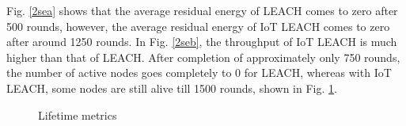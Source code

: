 \documentclass[11pt]{report}
\begin{document}
\begin{itemize}
    	\noindent Fig. \ref {2sea} shows that the average residual energy of LEACH comes to zero after 500 rounds, however, the average residual energy of IoT LEACH comes to zero after around 1250 rounds. In Fig. \ref {2seb}, the throughput of IoT LEACH is much higher than that of LEACH. After completion of approximately only 750 rounds, the number of active nodes goes completely to 0 for LEACH, whereas with IoT LEACH, some nodes are still alive till 1500 rounds, shown in Fig. \ref{3rd}.
    	\begin{figure}[!h]
    		\centering
    		\caption{Lifetime metrics}
    		\label{3rd}
    	\end{figure}
    \end{itemize}

    \newpage
\end{document}

